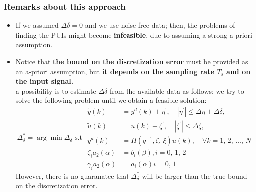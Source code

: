 \subsubsection{Remarks about this approach}
\begin{itemize}
    \item If we assumed $\Delta\delta = 0$ and we use noise-free data; then, the problems of finding the PUIs might become \textbf{infeasible}, due to assuming a strong a-priori assumption.
    \item Notice that \textbf{the bound on the discretization error} must be provided as an a-priori assumption, but \textbf{it depends on the sampling rate $T_s$ and on the input signal.}\\
    a possibility is to estimate $\Delta\delta$ from the available data as follows: we try to solve the following problem until we obtain a feasible solution:\\
    \[
    \Delta^{*}_\delta = \arg \min \Delta_\delta \text{  s.t  } 
    \begin{aligned}
\tilde{y}(k) &= y^d(k) + \eta^{'} , \quad |\eta^{'}| \leq \Delta\eta + \Delta\delta, \\
\tilde{u}(k) &= u(k) + \zeta^{'} , \quad |\zeta^{'}| \leq \Delta\zeta , \\
y^d(k) &= H(q^{-1},\zeta,\,\xi) u(k), \quad \forall k = 1,\, 2,\, \dots,\, N \\
\zeta_i a_2(\alpha) &= b_i(\beta), i = 0,\, 1,\,2\\
\gamma_i a_2(\alpha) &= a_i(\alpha) i = 0,\,1
\end{aligned}
    \]
    However, there is no guaranatee that $\Delta_\delta^{*}$ will  be larger than the true bound on the discretization error. 
\end{itemize}





